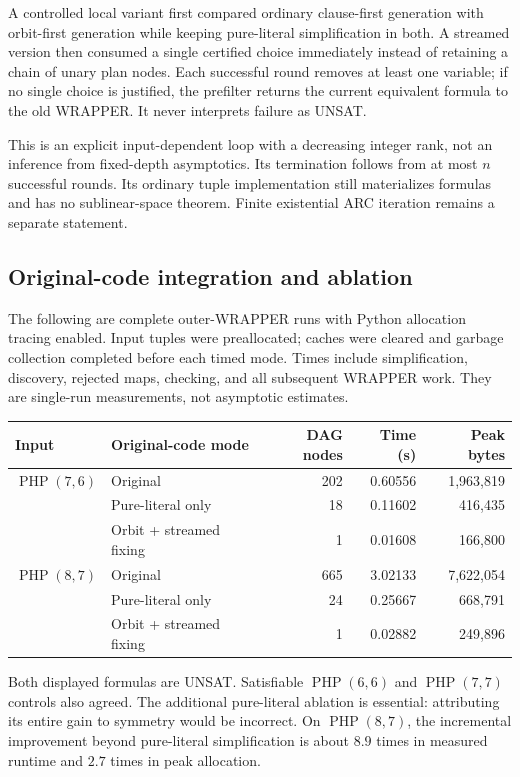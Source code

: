 \documentclass[11pt]{article}
\newcommand{\PHP}{\operatorname{PHP}}
\begin{document}
A controlled local variant first compared ordinary clause-first generation with orbit-first generation while keeping pure-literal simplification in both. A streamed version then consumed a single certified choice immediately instead of retaining a chain of unary plan nodes. Each successful round removes at least one variable; if no single choice is justified, the prefilter returns the current equivalent formula to the old WRAPPER. It never interprets failure as UNSAT.

This is an explicit input-dependent loop with a decreasing integer rank, not an inference from fixed-depth asymptotics. Its termination follows from at most $n$ successful rounds. Its ordinary tuple implementation still materializes formulas and has no sublinear-space theorem. Finite existential ARC iteration remains a separate statement.

\subsection{Original-code integration and ablation}
The following are complete outer-WRAPPER runs with Python allocation tracing enabled. Input tuples were preallocated; caches were cleared and garbage collection completed before each timed mode. Times include simplification, discovery, rejected maps, checking, and all subsequent WRAPPER work. They are single-run measurements, not asymptotic estimates.

\begin{center}\small
\begin{tabular}{llrrr}
\toprule
Input & Original-code mode & DAG nodes & Time (s) & Peak bytes \\
\midrule
$\PHP(7,6)$ & Original & 202 & 0.60556 & 1,963,819 \\
             & Pure-literal only & 18 & 0.11602 & 416,435 \\
             & Orbit + streamed fixing & 1 & 0.01608 & 166,800 \\
\addlinespace
$\PHP(8,7)$ & Original & 665 & 3.02133 & 7,622,054 \\
             & Pure-literal only & 24 & 0.25667 & 668,791 \\
             & Orbit + streamed fixing & 1 & 0.02882 & 249,896 \\
\bottomrule
\end{tabular}
\end{center}

Both displayed formulas are UNSAT. Satisfiable $\PHP(6,6)$ and $\PHP(7,7)$ controls also agreed. The additional pure-literal ablation is essential: attributing its entire gain to symmetry would be incorrect. On $\PHP(8,7)$, the incremental improvement beyond pure-literal simplification is about $8.9$ times in measured runtime and $2.7$ times in peak allocation.
\end{document}
